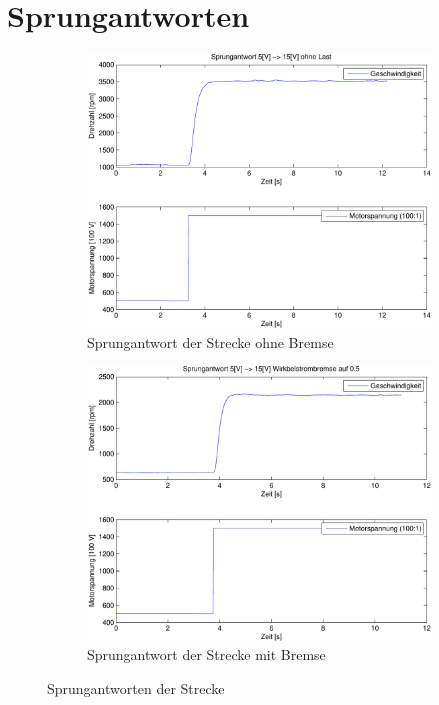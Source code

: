 \section{Sprungantworten}
\begin{figure}[h!]
	\centering
	\begin{subfigure}{0.475\textwidth}
		\includegraphics[width=1\textwidth]{06/step_plot_noload.pdf}
		\caption{Sprungantwort der Strecke ohne Bremse}
		\label{fig:06a}
	\end{subfigure}
	\hfill{}
	\begin{subfigure}{0.475\textwidth}
		\includegraphics[width=1\textwidth]{06/step_plot_load.pdf}
		\caption{Sprungantwort der Strecke mit Bremse}
		\label{fig:06b}
	\end{subfigure}
	\caption{Sprungantworten der Strecke}
\end{figure}
